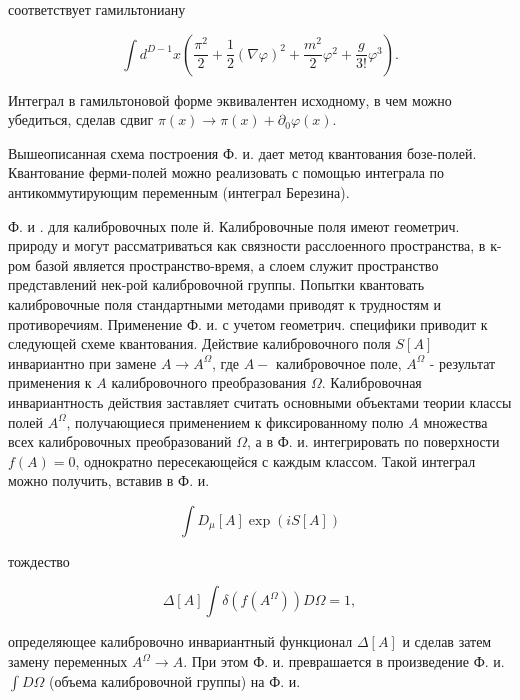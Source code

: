\documentclass[10pt]{article}
\begin{document}
соответствует гамильтониану



\[

\int d^{D-1} x\left(\frac{\pi^{2}}{2}+\frac{1}{2}(\nabla \varphi)^{2}+\frac{m^{2}}{2} \varphi^{2}+\frac{g}{3 !} \varphi^{3}\right) .

\]



Интеграл в гамильтоновой форме эквивалентен исходному, в чем можно убедиться, сделав сдвиг $\pi(x) \rightarrow \pi(x)+\partial_{0} \varphi(x)$.



Вышеописанная схема построения Ф. и. дает метод квантования бозе-полей. Квантование ферми-полей можно реализовать с помощью интеграла по антикоммутирующим переменным (интеграл Березина).



Ф. и . для калибровочных поле й. Калибровочные поля имеют геометрич. природу и могут рассматриваться как связности расслоенного пространства, в к-ром базой является пространство-время, а слоем служит пространство представлений нек-рой калибровочной группы. Попытки квантовать калибровочные поля стандартными методами приводят к трудностям и противоречиям. Применение Ф. и. с учетом геометрич. специфики приводит к следующей схеме квантования. Действие калибровочного поля $S[A]$ инвариантно при замене $A \rightarrow A^{\Omega}$, где $A-$ калибровочное поле, $A^{\Omega}$ - результат применения к $A$ калибровочного преобразования $\Omega$. Калибровочная инвариантность действия заставляет считать основными объектами теории классы полей $A^{\Omega}$, получающиеся применением к фиксированному полю $A$ множества всех калибровочных преобразований $\Omega$, а в Ф. и. интегрировать по поверхности $f(A)=0$, однократно пересекающейся с каждым классом. Такой интеграл можно получить, вставив в Ф. и.



\[

\int D_{\mu}[A] \exp (i S[A])

\]



тождество



\[

\Delta[A] \int \delta\left(f\left(A^{\Omega}\right)\right) D \Omega=1,

\]



определяющее калибровочно инвариантный функционал $\Delta[A]$ и сделав затем замену переменных $A^{\Omega} \rightarrow A$. При этом Ф. и. преврашается в произведение Ф. и. $\int D \Omega$ (объема калибровочной группы) на Ф. и.
\end{document}
